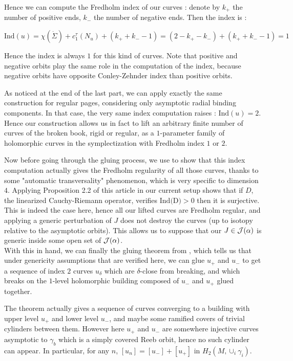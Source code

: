 \documentclass[../main.tex]{subfiles}
\begin{document}
Hence we can compute the Fredholm index of our curves : denote by $k_+$ the number of positive ends, $k_-$ the number of negative ends. Then the index is :

$$\text{Ind}(u) = \chi(\dot \Sigma) + c_1^\tau(N_u) + (k_+ + k_- - 1) = (2-k_+ - k_-) + (k_+ + k_- -1) = 1$$

Hence the index is always $1$ for this kind of curves. Note that positive and negative orbits play the same role in the computation of the index, because negative orbits have opposite Conley-Zehnder index than positive orbits.\\

\begin{remark}
   As noticed at the end of the last part, we can apply exactly the same construction for regular pages, considering only asymptotic radial binding components. In that case, the very same index computation raises : $\text{Ind}(u) = 2$. Hence our construction allows us in fact to lift an arbitrary finite number of curves of the broken book, rigid or regular, as a $1$-parameter family of holomorphic curves in the symplectization with Fredholm index $1$ or $2$. 
\end{remark}

Now before going through the gluing process, we use \cite{wendl_automatic_2009} to show that this index computation actually gives the Fredholm regularity of all those curves, thanks to some "automatic transversality" phenomenon, which is very specific to dimension $4$. Applying Proposition 2.2 of this article in our current setup shows that if $D$, the linearized Cauchy-Riemann operator, verifies $\text{Ind(D)}> 0$ then it is surjective. This is indeed the case here, hence all our lifted curves are Fredholm regular, and applying a generic perturbation of $J$ does not destroy the curves (up to isotopy relative to the asymptotic orbits). This allows us to suppose that our $J\in\mathcal{J}(\alpha)$ is generic inside some open set of $\mathcal{J}(\alpha)$. \\

With this in hand, we can finally the gluing theorem from \cite{hutchings_gluing_2007}, which tells us that under genericity assumptions that are verified here, we can glue $u_+$ and $u_-$ to get a sequence of index $2$ curves $u_\delta$ which are $\delta$-close from breaking, and which breaks on the $1$-level holomorphic building composed of $u_-$ and $u_+$ glued together. 

\begin{remark}
    The theorem actually gives a sequence of curves converging to a building with upper level $u_+$ and lower level $u_-$, and maybe some ramified covers of trivial cylinders between them. However here $u_+$ and $u_-$ are somewhere injective curves asymptotic to $\gamma_b$ which is a simply covered Reeb orbit, hence no such cylinder can appear. In particular, for any $n$, $[u_n] = [u_-] + [u_+]$ in $H_2(M,\cup_i\gamma_i)$.
\end{remark}
\end{document}
